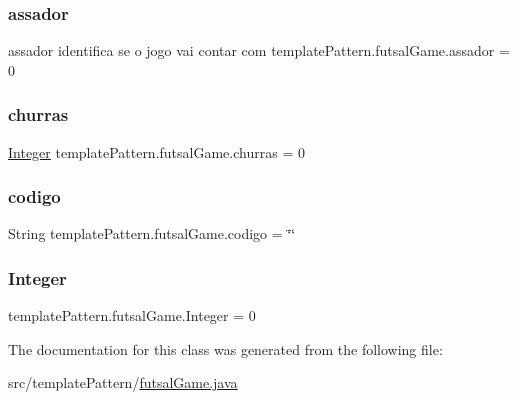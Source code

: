 \subsubsection{\texorpdfstring{assador}{assador}}
{\footnotesize\ttfamily assador identifica se o jogo vai contar com template\+Pattern.\+futsal\+Game.\+assador = 0}

\mbox{\label{classtemplate_pattern_1_1futsal_game_afc4d4a5cc3012b597ee01a896178c0c2}} 
\subsubsection{\texorpdfstring{churras}{churras}}
{\footnotesize\ttfamily \mbox{\hyperlink{classtemplate_pattern_1_1futsal_game_afac9cbfde51f806abfb78be46cca42e5}{Integer}} template\+Pattern.\+futsal\+Game.\+churras = 0}

\mbox{\label{classtemplate_pattern_1_1futsal_game_a1fe3c56de8ecfc3514aaf9150b2fd134}} 
\subsubsection{\texorpdfstring{codigo}{codigo}}
{\footnotesize\ttfamily String template\+Pattern.\+futsal\+Game.\+codigo = \char`\"{}\char`\"{}}

\mbox{\label{classtemplate_pattern_1_1futsal_game_afac9cbfde51f806abfb78be46cca42e5}} 
\subsubsection{\texorpdfstring{Integer}{Integer}}
{\footnotesize\ttfamily template\+Pattern.\+futsal\+Game.\+Integer = 0}



The documentation for this class was generated from the following file\+:\begin{DoxyCompactItemize}
\item 
src/template\+Pattern/\mbox{\hyperlink{futsal_game_8java}{futsal\+Game.\+java}}\end{DoxyCompactItemize}
